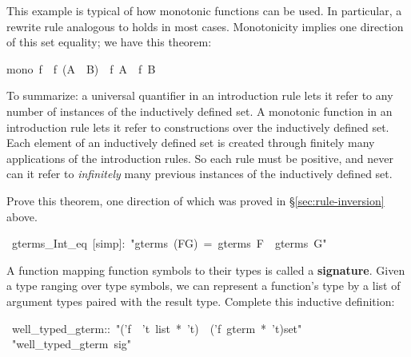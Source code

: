 This example is typical of how monotonic functions can be used.  In
particular, a rewrite rule analogous to  holds in most
cases.  Monotonicity implies one direction of this set equality; we have
this theorem:
\begin{isabelle}
mono\ f\ \isasymLongrightarrow \ f\ (A\ \isasyminter \ B)\ \isasymsubseteq \
f\ A\ \isasyminter \ f\ B%
\end{isabelle}


To summarize: a universal quantifier in an introduction rule 
lets it refer to any number of instances of 
the inductively defined set.  A monotonic function in an introduction 
rule lets it refer to constructions over the inductively defined 
set.  Each element of an inductively defined set is created 
through finitely many applications of the introduction rules.  So each rule
must be positive, and never can it refer to \textit{infinitely} many
previous instances of the inductively defined set. 



\begin{exercise}
Prove this theorem, one direction of which was proved in
\S\ref{sec:rule-inversion} above.
\begin{isabelle}
\ gterms_Int_eq\ [simp]:\ "gterms\ (F\isasyminter G)\ =\
gterms\ F\ \isasyminter \ gterms\ G"\isanewline
\end{isabelle}
\end{exercise}


\begin{exercise}
A function mapping function symbols to their 
types is called a \textbf{signature}.  Given a type 
ranging over type symbols, we can represent a function's type by a
list of argument types paired with the result type. 
Complete this inductive definition:
\begin{isabelle}
\ well_typed_gterm::\ "('f\ \isasymRightarrow \ 't\ list\ *\ 't)\ \isasymRightarrow \ ('f\ gterm\ *\ 't)set"\isanewline
{}\ "well_typed_gterm\ sig"\isanewline
\end{isabelle}
\end{exercise}

